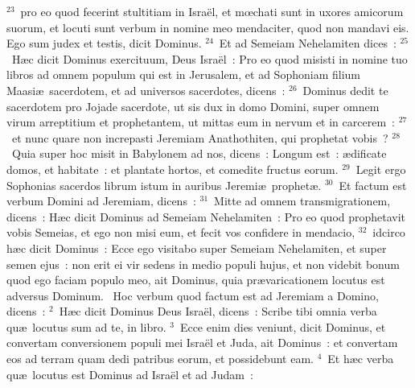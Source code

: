 ${}^{23}$~pro eo quod fecerint stultitiam in Isra\"el, et mœchati sunt in uxores amicorum suorum, et locuti sunt verbum in nomine meo mendaciter, quod non mandavi eis. Ego sum judex et testis, dicit Dominus.
${}^{24}$~Et ad Semeiam Nehelamiten dices~:
${}^{25}$~H\ae c dicit Dominus exercituum, Deus Isra\"el~: Pro eo quod misisti in nomine tuo libros ad omnem populum qui est in Jerusalem, et ad Sophoniam filium Maasi\ae\ sacerdotem, et ad universos sacerdotes, dicens~:
${}^{26}$~Dominus dedit te sacerdotem pro Jojade sacerdote, ut sis dux in domo Domini, super omnem virum arreptitium et prophetantem, ut mittas eum in nervum et in carcerem~:
${}^{27}$~et nunc quare non increpasti Jeremiam Anathothiten, qui prophetat vobis~?
${}^{28}$~Quia super hoc misit in Babylonem ad nos, dicens~: Longum est~: \ae dificate domos, et habitate~: et plantate hortos, et comedite fructus eorum.
${}^{29}$~Legit ergo Sophonias sacerdos librum istum in auribus Jeremi\ae\ prophet\ae .
${}^{30}$~Et factum est verbum Domini ad Jeremiam, dicens~:
${}^{31}$~Mitte ad omnem transmigrationem, dicens~: H\ae c dicit Dominus ad Semeiam Nehelamiten~: Pro eo quod prophetavit vobis Semeias, et ego non misi eum, et fecit vos confidere in mendacio,
${}^{32}$~idcirco h\ae c dicit Dominus~: Ecce ego visitabo super Semeiam Nehelamiten, et super semen ejus~: non erit ei vir sedens in medio populi hujus, et non videbit bonum quod ego faciam populo meo, ait Dominus, quia pr\ae varicationem locutus est adversus Dominum.
~Hoc verbum quod factum est ad Jeremiam a Domino, dicens~:
${}^{2}$~H\ae c dicit Dominus Deus Isra\"el, dicens~: Scribe tibi omnia verba qu\ae\ locutus sum ad te, in libro.
${}^{3}$~Ecce enim dies veniunt, dicit Dominus, et convertam conversionem populi mei Isra\"el et Juda, ait Dominus~: et convertam eos ad terram quam dedi patribus eorum, et possidebunt eam.
${}^{4}$~Et h\ae c verba qu\ae\ locutus est Dominus ad Isra\"el et ad Judam~:
